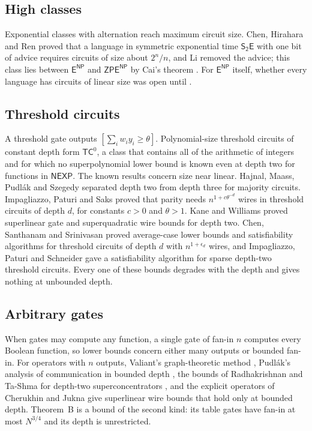 \documentclass[11pt,reqno]{amsart}
\numberwithin{equation}{section}
\theoremstyle{plain}
\theoremstyle{definition}
\theoremstyle{remark}
\newcommand{\NP}{\mathsf{NP}}
\newcommand{\ENP}{\mathsf{E}^{\mathsf{NP}}}
\newcommand{\NEXP}{\mathsf{NEXP}}
\newcommand{\TC}{\mathsf{TC}^0}
\begin{document}
\subsection{High classes}
Exponential classes with alternation reach maximum circuit size. Chen,
Hirahara and Ren \cite{CHR24} proved that a language in symmetric exponential
time $\mathsf{S_2E}$ with one bit of advice requires circuits of size about
$2^n/n$, and Li \cite{Li24} removed the advice; this class lies between
$\ENP$ and $\mathsf{ZPE}^{\NP}$ by Cai's theorem \cite{Cai07}. For $\ENP$
itself, whether every language has circuits of linear size was open until
\cite[Corollary C.1]{OAI26}.

\subsection{Threshold circuits}
A threshold gate outputs $[\sum_iw_iy_i\ge\theta]$. Polynomial-size threshold
circuits of constant depth form $\TC$, a class that contains all of the
arithmetic of integers and for which no superpolynomial lower bound is known
even at depth two for functions in $\NEXP$. The known results concern size near
linear. Hajnal, Maass, Pudl\'ak and Szegedy \cite{HMPST93} separated depth two
from depth three for majority circuits. Impagliazzo, Paturi and Saks
\cite{IPS97} proved that parity needs $n^{1+c\theta^{-d}}$ wires in threshold
circuits of depth $d$, for constants $c>0$ and $\theta>1$. Kane and Williams
\cite{KW16} proved superlinear gate and superquadratic wire bounds for depth
two. Chen, Santhanam and Srinivasan \cite{CSS18} proved average-case lower
bounds and satisfiability algorithms for threshold circuits of depth $d$ with
$n^{1+\epsilon_d}$ wires, and Impagliazzo, Paturi and Schneider \cite{IPS13}
gave a satisfiability algorithm for sparse depth-two threshold circuits.
Every one of these bounds degrades with the depth and gives nothing at
unbounded depth.

\subsection{Arbitrary gates}
When gates may compute any function, a single gate of fan-in $n$ computes every
Boolean function, so lower bounds concern either many outputs or bounded fan-in.
For operators with $n$ outputs, Valiant's graph-theoretic method \cite{Val77},
Pudl\'ak's analysis of communication in bounded depth \cite{Pud94}, the bounds
of Radhakrishnan and Ta-Shma for depth-two superconcentrators \cite{RTS00}, and
the explicit operators of Cherukhin \cite{Che11} and Jukna \cite{Juk10} give
superlinear wire bounds that hold only at bounded depth. Theorem~B is a bound of
the second kind: its table gates have fan-in at most $N^{3/4}$ and its depth is
unrestricted.
\end{document}
